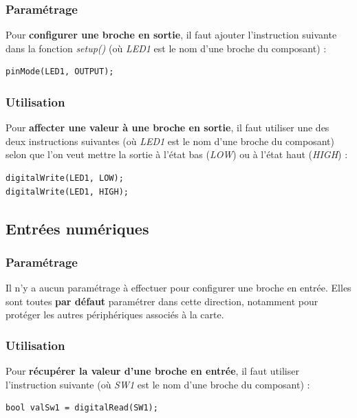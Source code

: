 \documentclass[a4paper,11pt,titlepage]{article} %
\begin{document}
\subsubsection{Paramétrage}

Pour \textbf{configurer une broche en sortie}, il faut ajouter l'instruction suivante dans la fonction \textsl{setup()} (où \textsl{LED1} est le nom d'une broche du composant) :

\begin{lstlisting}
pinMode(LED1, OUTPUT);
\end{lstlisting}

\subsubsection{Utilisation}

Pour \textbf{affecter une valeur à une broche en sortie}, il faut utiliser une des deux instructions suivantes (où \textsl{LED1} est le nom d'une broche du composant) selon que l'on veut mettre la sortie à l'état bas (\textit{LOW}) ou à l'état haut (\textit{HIGH}) :

\begin{lstlisting}
digitalWrite(LED1, LOW);
digitalWrite(LED1, HIGH);
\end{lstlisting}


\subsection{Entrées numériques}

\subsubsection{Paramétrage}

Il n'y a aucun paramétrage à effectuer pour configurer une broche en entrée. Elles sont toutes \textbf{par défaut} paramétrer dans cette direction, notamment pour protéger les autres périphériques associés à la carte.

\subsubsection{Utilisation}

Pour \textbf{récupérer la valeur d'une broche en entrée}, il faut utiliser l'instruction suivante (où \textsl{SW1} est le nom d'une broche du composant) :

\begin{lstlisting}
bool valSw1 = digitalRead(SW1);
\end{lstlisting}
\end{document}
